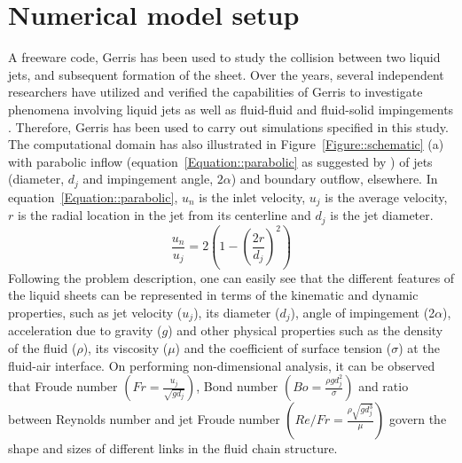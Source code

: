 \section{Numerical model setup}\label{sec::domainDes}
A freeware code, Gerris \citep{Popinet2003,popinet2009} has been used to study the collision between two liquid jets, and subsequent formation of the sheet. Over the years, several independent researchers have utilized and verified the capabilities of Gerris to investigate phenomena involving liquid jets \citep{Duchemin2002,fuster2013instability,yang2017simulation} as well as fluid-fluid \citep{chen2013high,zhang2017effects} and fluid-solid impingements \citep{visser2015dynamics,jian2018two}. Therefore, Gerris has been used to carry out simulations specified in this study. The computational domain has also illustrated in Figure~\ref{Figure::schematic} (a) with parabolic inflow (equation~\ref{Equation::parabolic} as suggested by \citet{choo2007effect}) of jets (diameter, $d_j$ and impingement angle, $2\alpha$) and boundary outflow, elsewhere. In equation~\ref{Equation::parabolic}, $u_n$ is the inlet velocity, $u_j$ is the average velocity, $r$ is the radial location in the jet from its centerline and $d_j$ is the jet diameter.
\begin{equation}\label{Equation::parabolic}
\frac{u_n}{u_j} = 2\left(1 - \left(\frac{2r}{d_j}\right)^2\right) 
\end{equation}
Following the problem description, one can easily see that the different features of the liquid sheets can be represented in terms of the kinematic and dynamic properties, such as jet velocity ($u_j$), its diameter ($d_j$), angle of impingement (2$\alpha$), acceleration due to gravity ($g$) and other physical properties such as the density of the fluid ($\rho$), its viscosity ($\mu$) and the coefficient of surface tension ($\sigma$) at the fluid-air interface. On performing non-dimensional analysis, it can be observed that Froude number $\left(Fr = \frac{u_j}{\sqrt{gd_j}}\right)$, Bond number $\left(Bo = \frac{\rho gd_j^2}{\sigma}\right)$ and ratio between Reynolds number and jet Froude number $\left(Re/Fr = \frac{\rho\sqrt{gd_j^3}}{\mu}\right)$ govern the shape and sizes of different links in the fluid chain structure.\\\par
